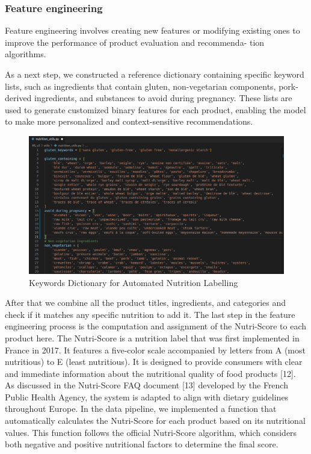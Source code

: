 \subsubsection{Feature engineering}
\par Feature engineering involves creating new features or modifying existing
ones to improve the performance of product evaluation and recommenda-
tion algorithms.

\par As a next step, we constructed a reference dictionary containing specific
keyword lists, such as ingredients that contain gluten, non-vegetarian
components, pork-derived ingredients, and substances to avoid during
pregnancy. These lists are used to generate customized binary features
for each product, enabling the model to make more personalized and
context-sensitive recommendations.

\begin{center}
\begin{figure}[H]
    \includegraphics[scale=0.35]{images/nutrition_utils.png}
    \caption{Keywords Dictionary for Automated Nutrition Labelling} 
    \label{fig:nutrition_utils_file}
\end{figure}
\end{center}

After that we combine all the product titles, ingredients, and categories
and check if it matches any specific nutrition to add it. The last step in the
feature engineering process is the computation and assignment of the
Nutri-Score to each product here.
The Nutri-Score is a nutrition label that was first implemented in France
in 2017. It features a five-color scale accompanied by letters from A (most
nutritious) to E (least nutritious). It is designed to provide consumers
with clear and immediate information about the nutritional quality of
food products [12]. As discussed in the Nutri-Score FAQ document [13]
developed by the French Public Health Agency, the system is adapted to
align with dietary guidelines throughout Europe. In the data pipeline,
we implemented a function that automatically calculates the Nutri-Score
for each product based on its nutritional values. This function follows
the official Nutri-Score algorithm, which considers both negative and
positive nutritional factors to determine the final score.

